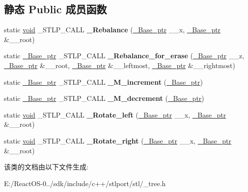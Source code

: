 \subsection*{静态 Public 成员函数}
\begin{DoxyCompactItemize}
\item 
\mbox{\label{class___rb__global_ac2d1b795ae202f15667f6da98b7659f4}} 
static \hyperlink{interfacevoid}{void} \+\_\+\+S\+T\+L\+P\+\_\+\+C\+A\+LL {\bfseries \+\_\+\+Rebalance} (\hyperlink{struct___rb__tree__node__base}{\+\_\+\+Base\+\_\+ptr} \+\_\+\+\_\+x, \hyperlink{struct___rb__tree__node__base}{\+\_\+\+Base\+\_\+ptr} \&\+\_\+\+\_\+root)
\item 
\mbox{\label{class___rb__global_a121fd76db66c54af1ca67b5cc02e3d45}} 
static \hyperlink{struct___rb__tree__node__base}{\+\_\+\+Base\+\_\+ptr} \+\_\+\+S\+T\+L\+P\+\_\+\+C\+A\+LL {\bfseries \+\_\+\+Rebalance\+\_\+for\+\_\+erase} (\hyperlink{struct___rb__tree__node__base}{\+\_\+\+Base\+\_\+ptr} \+\_\+\+\_\+z, \hyperlink{struct___rb__tree__node__base}{\+\_\+\+Base\+\_\+ptr} \&\+\_\+\+\_\+root, \hyperlink{struct___rb__tree__node__base}{\+\_\+\+Base\+\_\+ptr} \&\+\_\+\+\_\+leftmost, \hyperlink{struct___rb__tree__node__base}{\+\_\+\+Base\+\_\+ptr} \&\+\_\+\+\_\+rightmost)
\item 
\mbox{\label{class___rb__global_ae996f25276d6ade19e03cea2efc247f0}} 
static \hyperlink{struct___rb__tree__node__base}{\+\_\+\+Base\+\_\+ptr} \+\_\+\+S\+T\+L\+P\+\_\+\+C\+A\+LL {\bfseries \+\_\+\+M\+\_\+increment} (\hyperlink{struct___rb__tree__node__base}{\+\_\+\+Base\+\_\+ptr})
\item 
\mbox{\label{class___rb__global_a72a5ac8825fec7fc52ad7984cecbc68a}} 
static \hyperlink{struct___rb__tree__node__base}{\+\_\+\+Base\+\_\+ptr} \+\_\+\+S\+T\+L\+P\+\_\+\+C\+A\+LL {\bfseries \+\_\+\+M\+\_\+decrement} (\hyperlink{struct___rb__tree__node__base}{\+\_\+\+Base\+\_\+ptr})
\item 
\mbox{\label{class___rb__global_a46b6bba6dae86415dbd47c2171810335}} 
static \hyperlink{interfacevoid}{void} \+\_\+\+S\+T\+L\+P\+\_\+\+C\+A\+LL {\bfseries \+\_\+\+Rotate\+\_\+left} (\hyperlink{struct___rb__tree__node__base}{\+\_\+\+Base\+\_\+ptr} \+\_\+\+\_\+x, \hyperlink{struct___rb__tree__node__base}{\+\_\+\+Base\+\_\+ptr} \&\+\_\+\+\_\+root)
\item 
\mbox{\label{class___rb__global_af4cf52348bb1c8aca7e456292fbc139d}} 
static \hyperlink{interfacevoid}{void} \+\_\+\+S\+T\+L\+P\+\_\+\+C\+A\+LL {\bfseries \+\_\+\+Rotate\+\_\+right} (\hyperlink{struct___rb__tree__node__base}{\+\_\+\+Base\+\_\+ptr} \+\_\+\+\_\+x, \hyperlink{struct___rb__tree__node__base}{\+\_\+\+Base\+\_\+ptr} \&\+\_\+\+\_\+root)
\end{DoxyCompactItemize}


该类的文档由以下文件生成\+:\begin{DoxyCompactItemize}
\item 
E\+:/\+React\+O\+S-\/0../sdk/include/c++/stlport/stl/\+\_\+tree.\+h\end{DoxyCompactItemize}

